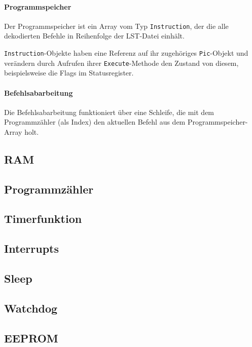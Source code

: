 \paragraph{Programmspeicher}
Der Programmspeicher ist ein Array vom Typ \texttt{Instruction},
der die alle dekodierten Befehle in Reihenfolge der LST-Datei einhält. 

\texttt{Instruction}-Objekte haben eine Referenz auf ihr zugehöriges \texttt{Pic}-Objekt
und verändern durch Aufrufen ihrer \texttt{Execute}-Methode den Zustand von diesem,
beispielsweise die Flags im Statusregister.


\paragraph{Befehlsabarbeitung}
Die Befehlsabarbeitung funktioniert über eine Schleife,
die mit dem Programmzähler (als Index) den aktuellen Befehl aus dem Programmspeicher-Array holt.


\subsection{RAM}


\subsection{Programmzähler}


\subsection{Timerfunktion}


\subsection{Interrupts}


\subsection{Sleep}


\subsection{Watchdog}


\subsection{EEPROM}


